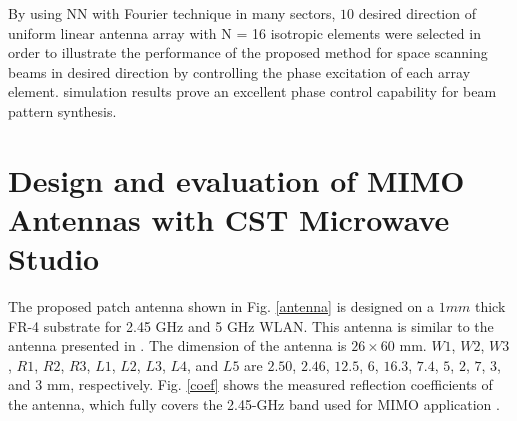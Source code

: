 \documentclass[conference]{IEEEtran}
\begin{document}
By using NN with Fourier technique in many sectors, $10$ desired direction of uniform linear antenna array with N = 16 isotropic elements were selected in order to illustrate the performance of the proposed method for space scanning beams in desired direction by controlling the phase excitation of each array element. simulation results prove an excellent phase control capability for beam pattern synthesis. 


\section{Design and evaluation of MIMO Antennas with CST Microwave Studio}

The proposed patch antenna shown in Fig. \ref{antenna} is designed on a $1mm$ thick FR-4 substrate for 2.45 GHz and 5 GHz WLAN. This antenna is similar to the antenna presented in \cite{bowtie}. The dimension of the antenna is $26 \times 60$ mm. $W1$, $W2$, $W3$, $R1$, $R2$, $R3$, $L1$, $L2$, $L3$, $L4$, and $L5$ are $2.50$, $2.46$, $12.5$, $6$, $16.3$, $7.4$, $5$, $2$, $7$, $3$, and $3$ mm, respectively. Fig. \ref{coef} shows the measured reflection coefficients of the antenna, which fully covers the 2.45-GHz band used for MIMO application \cite{article15}. 

\begin{figure} [!ht]
\end{figure}
\end{document}
